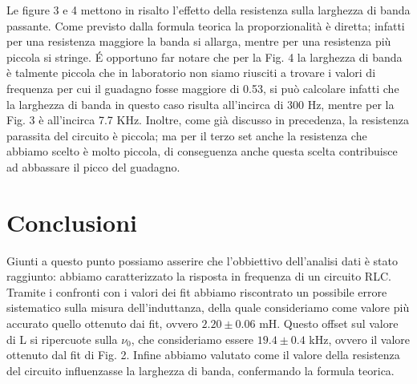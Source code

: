 \documentclass[9pt,a4paper,twocolumn,twoside]{tau-class/tau}
\begin{document}
Le figure 3 e 4 mettono in risalto l'effetto della resistenza sulla larghezza di banda passante. Come previsto dalla formula teorica la proporzionalità è diretta; infatti per una resistenza maggiore la banda si allarga, mentre per una resistenza più piccola si stringe. \'E opportuno far notare che per la Fig. 4 la larghezza di banda è talmente piccola che in laboratorio non siamo riusciti a trovare i valori di frequenza per cui il guadagno fosse maggiore di 0.53, si può calcolare infatti che la larghezza di banda in questo caso risulta all'incirca di 300 Hz, mentre per la Fig. 3 è all'incirca 7.7 KHz. Inoltre, come già discusso in precedenza, la resistenza parassita del circuito è piccola; ma per il terzo set anche la resistenza che abbiamo scelto è molto piccola, di conseguenza anche questa scelta contribuisce ad abbassare il picco del guadagno.\\
    
\section{Conclusioni}
Giunti a questo punto possiamo asserire che l'obbiettivo dell'analisi dati è stato raggiunto: abbiamo caratterizzato la risposta in frequenza di un circuito RLC.\\
Tramite i confronti con i valori dei fit abbiamo riscontrato un possibile errore sistematico sulla misura dell'induttanza, della quale consideriamo come valore più accurato quello ottenuto dai fit, ovvero $2.20 \pm 0.06$ mH. Questo offset sul valore di L si ripercuote sulla $\nu_0$, che consideriamo essere $19.4 \pm 0.4$ kHz, ovvero il valore ottenuto dal fit di Fig. 2. Infine abbiamo valutato come il valore della resistenza del circuito influenzasse la larghezza di banda, confermando la formula teorica.
\end{document}
